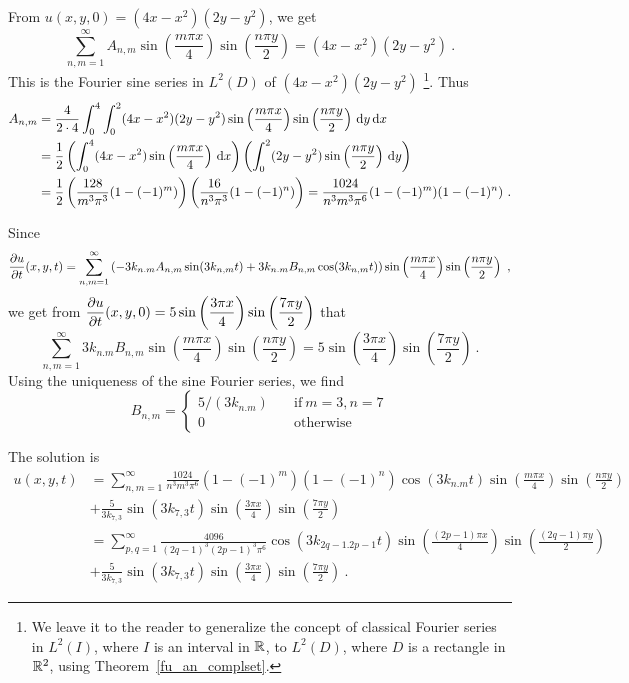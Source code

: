 \begin{egg}
From $u(x,y,0) = (4x-x^2)(2y-y^2)$, we get
\[
\sum_{n,m=1}^\infty A_{n,m}\sin\left(\frac{m\pi x}{4}\right)
\sin\left(\frac{n\pi y}{2}\right) = (4x-x^2)(2y-y^2) \ .
\]
This is the Fourier sine series in $\displaystyle L^2(D)$ of $(4x-x^2)(2y-y^2)$
\footnote{We leave it to the reader to generalize the concept of
classical Fourier series in $L^2(I)$, where $I$ is an interval in
$\mathbb{R}$, to $L^2(D)$, where $D$ is a rectangle in $\mathbb{R}^2$, using
Theorem~\ref{fu_an_complset}.}.  Thus
\begin{align*}
A_{n,m} &= \frac{4}{2\cdot 4} \int_0^4 \int_0^2 (4x-x^2)(2y-y^2)
\sin\left(\frac{m\pi x}{4}\right)
\sin\left(\frac{n\pi y}{2}\right) \,\mathrm{d}{y}\,\mathrm{d}{x} \\
&= \frac{1}{2}
\left(\int_0^4 (4x-x^2) \sin\left(\frac{m\pi x}{4}\right) \,\mathrm{d}{x} \right)
\left( \int_0^2 (2y-y^2)\sin\left(\frac{n\pi y}{2}\right) \,\mathrm{d}{y} \right) \\
&= \frac{1}{2}\left( \frac{128}{m^3\pi^3}(1-(-1)^m)\right)
\left(\frac{16}{n^3\pi^3} (1-(-1)^n)\right)
= \frac{1024}{n^3 m^3 \pi^6} (1-(-1)^m)(1-(-1)^n) \ .
\end{align*}

Since
\[
\frac{\partial{u}}{\partial t}(x,y,t) = \sum_{n,m=1}^\infty
\left(-3 k_{n.m}A_{n,m} \sin(3 k_{n,m} t) + 3 k_{n.m} B_{n,m}
\cos(3 k_{n,m} t)\right)\sin\left(\frac{m\pi x}{4}\right)
\sin\left(\frac{n\pi y}{2}\right) \ ,
\]
we get from $\displaystyle
\frac{\partial{u}}{\partial t}(x,y,0) = 5\sin\left(\frac{3\pi x}{4}\right)
\sin\left(\frac{7\pi y}{2}\right)$ that
\[
\sum_{n,m=1}^\infty 3 k_{n.m} B_{n,m}\sin\left(\frac{m\pi x}{4}\right)
\sin\left(\frac{n\pi y}{2}\right) = 5\sin\left(\frac{3\pi x}{4}\right)
\sin\left(\frac{7\pi y}{2}\right) \ .
\]
Using the uniqueness of the sine Fourier series, we find
\[
B_{n,m} = \begin{cases}
5/(3k_{n.m}) & \quad \text{if}\ m=3,n=7 \\
0 & \quad \text{otherwise}
\end{cases}
\]

The solution is
\begin{align*}
u(x,y,t) &= \sum_{n,m=1}^\infty \frac{1024}{n^3 m^3 \pi^6} (1-(-1)^m)(1-(-1)^n)
\cos(3 k_{n.m} t)\sin\left(\frac{m\pi x}{4}\right)
\sin\left(\frac{n\pi y}{2}\right) \\
&+ \frac{5}{3k_{7,3}} \sin (3k_{7,3} t)
\sin\left(\frac{3\pi x}{4}\right)
\sin\left(\frac{7\pi y}{2}\right) \\
&= \sum_{p,q=1}^\infty \frac{4096}{(2q-1)^3 (2p-1)^3 \pi^6}
\cos(3 k_{2q-1.2p-1} t)\sin\left(\frac{(2p-1)\pi x}{4}\right)
\sin\left(\frac{(2q-1)\pi y}{2}\right) \\
&+ \frac{5}{3k_{7,3}} \sin (3k_{7,3} t)
\sin\left(\frac{3\pi x}{4}\right)
\sin\left(\frac{7\pi y}{2}\right) \ .
\end{align*}
\end{egg}


